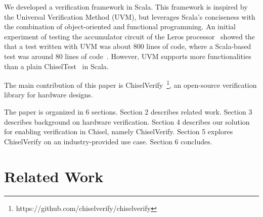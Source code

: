 \documentclass[conference]{IEEEtran}
\newcommand{\todo}[1]{{\color{olive} TODO: #1}}
\begin{document}
We developed a verification framework in Scala.
This framework is inspired by the Universal Verification Method (UVM), but leverages Scala's conciseness with the
combination of object-oriented and functional programming.
An initial experiment of testing the accumulator circuit of the Leros processor~\cite{leros:arcs2019}
showed the that a test written with UVM was about 800 lines of code, where a Scala-based
test was around 80 lines of code~\cite{verify:chisel:2020}.
However, UVM supports more functionalities than a plain ChiselTest~\cite{chisel:tester2} in Scala.

%
%
%


The main contribution of this paper is ChiselVerify~\footnote{https://github.com/chiselverify/chiselverify}, an open-source verification library for hardware designs.

The paper is organized in 6 sections.
Section 2 describes related work.
Section 3 describes background on hardware verification.
Section 4 describes our solution for enabling verification in Chisel, namely ChiselVerify.
Section 5 explores ChiselVerify on an industry-provided use case.
Section 6 concludes.

\section{Related Work}
\end{document}
